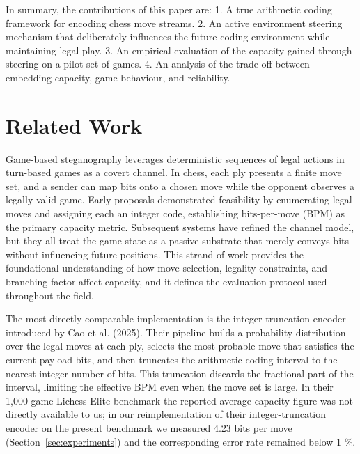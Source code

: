 \documentclass[journal]{IEEEtran}
\begin{document}
In summary, the contributions of this paper are:
1. A true arithmetic coding framework for encoding chess move streams.
2. An active environment steering mechanism that deliberately influences the future coding environment while maintaining legal play.
3. An empirical evaluation of the capacity gained through steering on a pilot set of games.
4. An analysis of the trade-off between embedding capacity, game behaviour, and reliability.

\section{Related Work}\label{sec:related_work}
Game-based steganography leverages deterministic sequences of legal actions in turn-based games as a covert channel. In chess, each ply presents a finite move set, and a sender can map bits onto a chosen move while the opponent observes a legally valid game. Early proposals demonstrated feasibility by enumerating legal moves and assigning each an integer code, establishing bits-per-move (BPM) as the primary capacity metric. Subsequent systems have refined the channel model, but they all treat the game state as a passive substrate that merely conveys bits without influencing future positions. This strand of work provides the foundational understanding of how move selection, legality constraints, and branching factor affect capacity, and it defines the evaluation protocol used throughout the field.

The most directly comparable implementation is the integer-truncation encoder introduced by Cao et al. (2025). Their pipeline builds a probability distribution over the legal moves at each ply, selects the most probable move that satisfies the current payload bits, and then truncates the arithmetic coding interval to the nearest integer number of bits. This truncation discards the fractional part of the interval, limiting the effective BPM even when the move set is large. In their 1,000-game Lichess Elite benchmark the reported average capacity figure was not directly available to us; in our reimplementation of their integer-truncation encoder on the present benchmark we measured 4.23 bits per move (Section~\ref{sec:experiments}) and the corresponding error rate remained below 1 \%.
\end{document}
